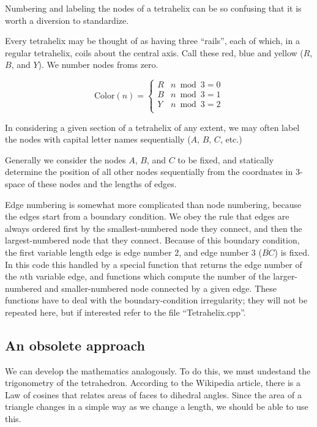 \documentclass[11pt]{article}
\begin{document}
Numbering and labeling the nodes of a tetrahelix can be so confusing that it is worth a diversion to standardize.

Every tetrahelix may be thought of as having three ``rails'', each of which, in a regular tetrahelix, coils about
the central axis. Call these red, blue and yellow ($R$,$B$, and $Y$). We number nodes froms zero.

\[ \text{Color}(n) = \begin{cases} 
      R & n \bmod 3 = 0 \\
      B & n \bmod 3 = 1 \\
      Y & n \bmod 3 = 2 \\
   \end{cases}
\]

In considering a given section of a tetrahelix of any extent, we may often label the nodes with capital letter names sequentially ($A$, $B$, $C$, etc.)

Generally we consider the nodes $A$, $B$, and $C$ to be fixed, and statically determine the position of all other nodes sequentially
from the coordnates in 3-space of these nodes and the lengths of edges.

Edge numbering is somewhat more complicated than node numbering, because the edges start from a boundary condition.
We obey the rule that edges are always ordered first by the smallest-numbered node they connect, and then the largest-numbered node
that they connect. Because of this boundary condition, the first variable length edge is edge number $2$, and edge number $3$ ($\overline{BC}$)
is fixed. In this code this handled by a special function that returns the edge number of the $n$th variable edge, and
functions which compute the number of the larger-numbered and smaller-numbered node connected by a given edge.
These functions have to deal with the boundary-condition irregularity; they will not be repeated here, but if interested
refer to the file ``Tetrahelix.cpp''.

\subsection{An obsolete approach}

We can develop the mathematics analogously. To do this, we must undestand the trigonometry
of the tetrahedron. According to the Wikipedia
article\cite{https://en.wikipedia.org/wiki/Tetrahedron}, there is a Law of cosines that relates areas of faces to dihedral angles.
Since the area of a triangle changes in a simple way as we change a length, we
should be able to use this.
\end{document}
